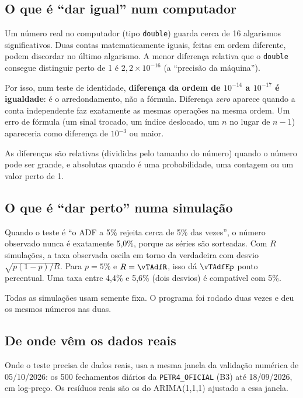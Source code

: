 \documentclass[11pt,a4paper]{article}
\begin{document}
\subsection{O que é ``dar igual'' num computador}

Um número real no computador (tipo \texttt{double}) guarda cerca de 16 algarismos significativos. Duas contas
matematicamente iguais, feitas em ordem diferente, podem discordar no último algarismo. A menor diferença
relativa que o \texttt{double} consegue distinguir perto de 1 é $2{,}2\times10^{-16}$ (a ``precisão da
máquina'').

Por isso, num teste de identidade, \textbf{diferença da ordem de $10^{-14}$ a $10^{-17}$ é igualdade}: é o
arredondamento, não a fórmula. Diferença \emph{zero} aparece quando a conta independente faz exatamente as mesmas
operações na mesma ordem. Um erro de fórmula (um sinal trocado, um índice deslocado, um $n$ no lugar de
$n-1$) apareceria como diferença de $10^{-3}$ ou maior.

As diferenças são relativas (divididas pelo tamanho do número) quando o número pode ser grande, e absolutas
quando é uma probabilidade, uma contagem ou um valor perto de 1.

\subsection{O que é ``dar perto'' numa simulação}

Quando o teste é ``o ADF a 5\% rejeita cerca de 5\% das vezes'', o número observado nunca é exatamente 5,0\%,
porque as séries são sorteadas. Com $R$ simulações, a taxa observada oscila em torno da verdadeira com desvio
$\sqrt{p(1-p)/R}$. Para $p = 5\%$ e $R = \vTAdfR$, isso dá $\vTAdfEp$ ponto percentual. Uma taxa entre 4,4\% e
5,6\% (dois desvios) é compatível com 5\%.

Todas as simulações usam semente fixa. O programa foi rodado duas vezes e deu os mesmos números nas duas.

\subsection{De onde vêm os dados reais}

Onde o teste precisa de dados reais, usa a mesma janela da validação numérica de 05/10/2026: os 500 fechamentos
diários da \texttt{PETR4\_OFICIAL} (B3) até 18/09/2026, em log-preço. Os resíduos reais são os do ARIMA(1,1,1)
ajustado a essa janela.
\end{document}
